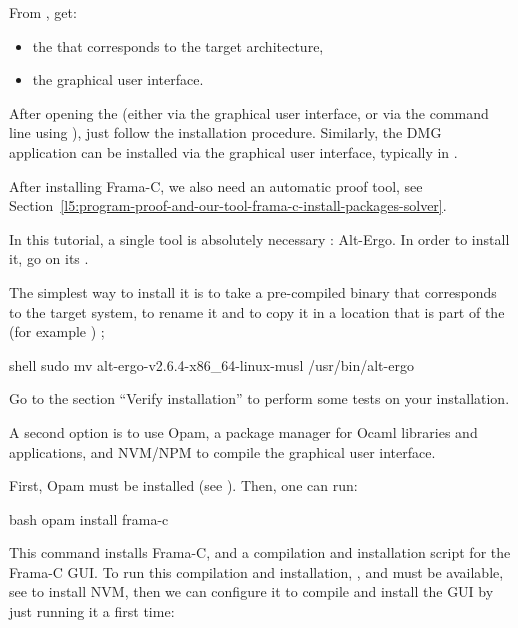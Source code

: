 From ,
get:
\begin{itemize}
  \item the  that corresponds to the target architecture,
  \item the graphical user interface.
\end{itemize}


After opening the  (either via the graphical user interface, or
via the command line using ), just follow the installation
procedure. Similarly, the DMG application can be installed via the graphical
user interface, typically in .


After installing Frama-C, we also need an automatic proof tool, see
Section~\ref{l5:program-proof-and-our-tool-frama-c-install-packages-solver}.


\label{l5:program-proof-and-our-tool-frama-c-install-packages-solver}


In this tutorial, a single tool is absolutely necessary : Alt\nobreakdash-Ergo.
In order to install it, go on its .


The simplest way to install it is to take a pre-compiled binary that corresponds
to the target system, to rename it  and to copy it in a
location that is part of the  (for example ) ;
\begin{CodeBlock}{shell}
sudo mv alt-ergo-v2.6.4-x86_64-linux-musl /usr/bin/alt-ergo
\end{CodeBlock}


Go to the section ``Verify installation'' to perform some tests on
your installation.




A second option is to use Opam, a package manager for Ocaml libraries
and applications, and NVM/NPM to compile the graphical user interface.


First, Opam must be installed (see
). Then,
one can run:


\begin{CodeBlock}{bash}
opam install frama-c
\end{CodeBlock}


This command installs Frama-C, and a compilation and installation script for the
Frama-C GUI. To run this compilation and installation, ,
 and  must be available, see
to install NVM, then we can configure it to compile and install the GUI by just
running it a first time:


